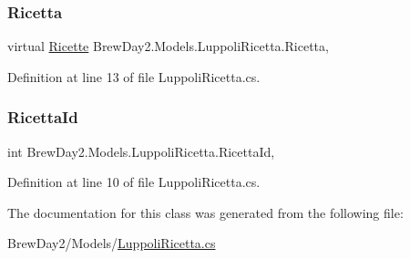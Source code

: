 \mbox{\label{class_brew_day2_1_1_models_1_1_luppoli_ricetta_a81a1298021f67bc36943672a5e4f9c9f}} 
\subsubsection{\texorpdfstring{Ricetta}{Ricetta}}
{\footnotesize\ttfamily virtual \mbox{\hyperlink{class_brew_day2_1_1_models_1_1_ricette}{Ricette}} Brew\+Day2.\+Models.\+Luppoli\+Ricetta.\+Ricetta\hspace{0.3cm}{\ttfamily [get]}, {\ttfamily [set]}}



Definition at line 13 of file Luppoli\+Ricetta.\+cs.

\mbox{\label{class_brew_day2_1_1_models_1_1_luppoli_ricetta_ab2c1bae28627039dc836b0911211bf2e}} 
\subsubsection{\texorpdfstring{Ricetta\+Id}{RicettaId}}
{\footnotesize\ttfamily int Brew\+Day2.\+Models.\+Luppoli\+Ricetta.\+Ricetta\+Id\hspace{0.3cm}{\ttfamily [get]}, {\ttfamily [set]}}



Definition at line 10 of file Luppoli\+Ricetta.\+cs.



The documentation for this class was generated from the following file\+:\begin{DoxyCompactItemize}
\item 
Brew\+Day2/\+Models/\mbox{\hyperlink{_luppoli_ricetta_8cs}{Luppoli\+Ricetta.\+cs}}\end{DoxyCompactItemize}
